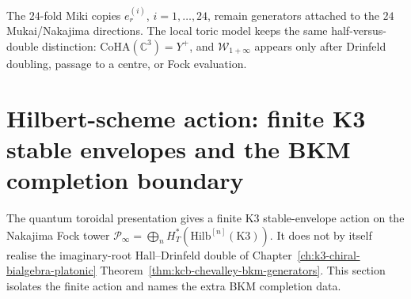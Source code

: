 \begin{remark}
The $24$-fold Miki copies $e^{(i)}_r$, $i=1,\dots,24$, remain generators
attached to the $24$ Mukai/Nakajima directions. The local toric model
keeps the same half-versus-double distinction:
$\mathrm{CoHA}(\mathbb C^3)=Y^+$, and
$\mathcal W_{1+\infty}$ appears only after Drinfeld doubling, passage
to a centre, or Fock evaluation.
\end{remark}

\section{Hilbert-scheme action: finite K3 stable envelopes and the BKM completion boundary}
\label{sec:k3qt-mo-stabilisation}

The quantum toroidal presentation gives a finite K3 stable-envelope
action on the Nakajima Fock tower
$\mathcal P_\infty=\bigoplus_nH^*_T(\mathrm{Hilb}^{[n]}(\mathrm K3))$.
It does not by itself realise the imaginary-root Hall--Drinfeld double
of Chapter~\ref{ch:k3-chiral-bialgebra-platonic}
Theorem~\ref{thm:kcb-chevalley-bkm-generators}. This section isolates
the finite action and names the extra BKM completion data.

